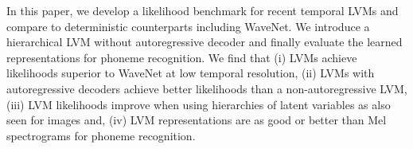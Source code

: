 In this paper, we develop a likelihood benchmark for recent temporal LVMs and compare to deterministic counterparts including WaveNet. We introduce a hierarchical LVM without autoregressive decoder and finally evaluate the learned representations for phoneme recognition. We find that 
(i) LVMs achieve likelihoods superior to WaveNet at low temporal resolution, 
(ii) LVMs with autoregressive decoders achieve better likelihoods than a non-autoregressive LVM, 
(iii) LVM likelihoods improve when using hierarchies of latent variables as also seen for images and, 
(iv) LVM representations are as good or better than Mel spectrograms for phoneme recognition.


\iffalse

\begin{figure*}[t!]
    \centering
    \begin{multicols}{5}
    \setlength\columnsep{0mm}
    \\
\end{multicols}
\end{figure*}
